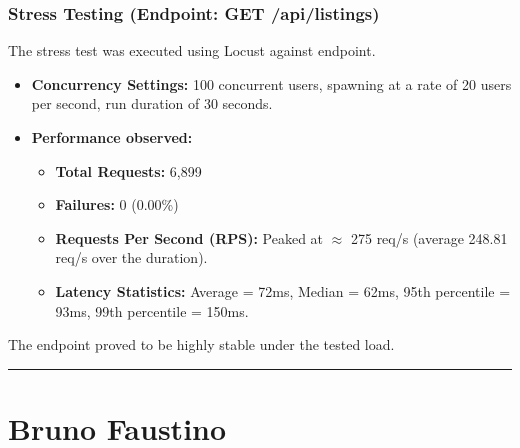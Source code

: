 \documentclass[11pt,a4paper]{article}
\begin{document}
\subsubsection*{Stress Testing (Endpoint: GET /api/listings)}
The stress test was executed using Locust against endpoint.
\begin{itemize}
    \item \textbf{Concurrency Settings:} 100 concurrent users, spawning at a rate of 20 users per second, run duration of 30 seconds.
    \item \textbf{Performance observed:}
    \begin{itemize}
        \item \textbf{Total Requests:} 6,899
        \item \textbf{Failures:} 0 (0.00\%)
        \item \textbf{Requests Per Second (RPS):} Peaked at $\approx$ 275 req/s (average 248.81 req/s over the duration).
        \item \textbf{Latency Statistics:} Average = 72ms, Median = 62ms, 95th percentile = 93ms, 99th percentile = 150ms.
    \end{itemize}
\end{itemize}
The endpoint proved to be highly stable under the tested load.

\vspace{1cm}
\hrule
\vspace{1cm}

\section*{Bruno Faustino}
\end{document}
